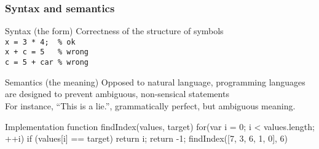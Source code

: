 \begin{frame}[fragile]
 \frametitle{Syntax and semantics}
   \begin{block}{Syntax (the form)}
   Correctness of the structure of symbols \\
   \lstinline$x = 3 * 4;  % ok$ \\
   \lstinline$x + c = 5   % wrong$ \\
   \lstinline$c = 5 + car % wrong$
   \end{block}
  \begin{block}{Semantics (the meaning)}
   Opposed to natural language, programming languages are designed to prevent ambiguous, non-sensical statements  \\
   For instance, ``This is a lie.'', grammatically perfect, but ambiguous meaning.
   \end{block}
\end{frame}


Implementation
function findIndex(values, target) {
  for(var i = 0; i < values.length; ++i){
    if (values[i] == target) { return i; }
  }
  return -1;
}
findIndex([7, 3, 6, 1, 0], 6)

